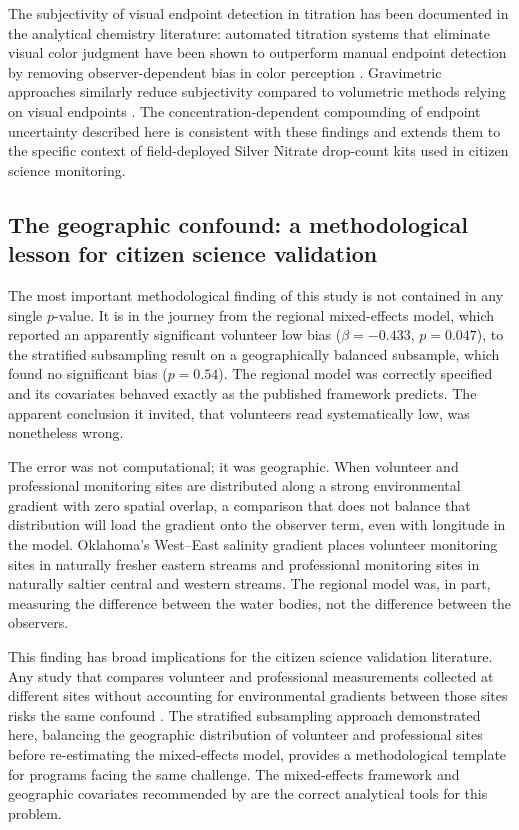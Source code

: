 \documentclass[lineno]{wlpeerj}
\begin{document}
The subjectivity of visual endpoint detection in titration has been documented in the analytical chemistry literature: automated titration systems that eliminate visual color judgment have been shown to outperform manual endpoint detection by removing observer-dependent bias in color perception \citep{Boppana2023}. Gravimetric approaches similarly reduce subjectivity compared to volumetric methods relying on visual endpoints \citep{Kejla2022}. The concentration-dependent compounding of endpoint uncertainty described here is consistent with these findings and extends them to the specific context of field-deployed Silver Nitrate drop-count kits used in citizen science monitoring.

\subsection{The geographic confound: a methodological lesson for citizen science validation}

The most important methodological finding of this study is not contained in any single $p$-value. It is in the journey from the regional mixed-effects model, which reported an apparently significant volunteer low bias ($\beta = -0.433$, $p = 0.047$), to the stratified subsampling result on a geographically balanced subsample, which found no significant bias ($p = 0.54$). The regional model was correctly specified and its covariates behaved exactly as the published framework predicts. The apparent conclusion it invited, that volunteers read systematically low, was nonetheless wrong.

The error was not computational; it was geographic. When volunteer and professional monitoring sites are distributed along a strong environmental gradient with zero spatial overlap, a comparison that does not balance that distribution will load the gradient onto the observer term, even with longitude in the model. Oklahoma's West--East salinity gradient \citep{Dyer2025} places volunteer monitoring sites in naturally fresher eastern streams and professional monitoring sites in naturally saltier central and western streams. The regional model was, in part, measuring the difference between the water bodies, not the difference between the observers.

This finding has broad implications for the citizen science validation literature. Any study that compares volunteer and professional measurements collected at different sites without accounting for environmental gradients between those sites risks the same confound \citep{Dormann2007}. The stratified subsampling approach demonstrated here, balancing the geographic distribution of volunteer and professional sites before re-estimating the mixed-effects model, provides a methodological template for programs facing the same challenge. The mixed-effects framework and geographic covariates recommended by \citet{Dyer2025} are the correct analytical tools for this problem.
\end{document}
